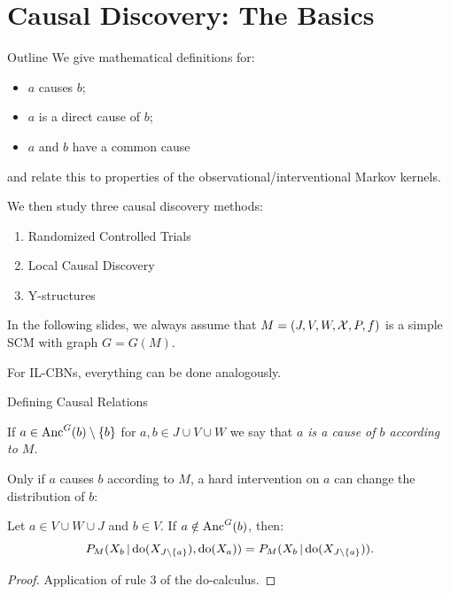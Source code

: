 \part{Causal Discovery: The Basics}
\frame{\partpage}

\begin{frame}{Outline}
  We give mathematical definitions for:
  \begin{itemize}
    \item $a$ causes $b$;
    \item $a$ is a direct cause of $b$;
    \item $a$ and $b$ have a common cause
  \end{itemize}
  and relate this to properties of the observational/interventional Markov kernels.

  \medskip
  We then study three causal discovery methods:
  \begin{enumerate}
    \item Randomized Controlled Trials
    \item Local Causal Discovery
    \item Y-structures
  \end{enumerate}

  \bigskip
  In the following slides, we always assume that
  $M = \left ( J, V, W, \mathcal{X}, P, f \right )$ is a simple SCM with graph $G = G(M)$.

  \bigskip
  For IL-CBNs, everything can be done analogously.
\end{frame}

\begin{frame}{Defining Causal Relations}\label{frame:causes}
\begin{Def}
  If $a \in \mathrm{Anc}^G(b)\setminus \{b\}$ for $a, b \in J \cup V \cup W$ we say that \emph{$a$ is a cause of $b$ according to $M$}.
\end{Def}
Only if $a$ causes $b$ according to $M$, a hard intervention on $a$ can change the distribution of $b$: 
\begin{Prp}
  Let $a \in V \cup W \cup J$ and $b \in V$.
  If $a \notin \mathrm{Anc}^G(b)$, then:
  $$P_{M}(X_b \operatorname*{|} \operatorname{do}(X_{J\setminus \{a\}}),\operatorname{do}(X_a)) = P_{M}(X_b \operatorname*{|} \operatorname{do}(X_{J\setminus \{a\}})).$$
\end{Prp}
\begin{proof}
  Application of rule 3 of the do-calculus.
\end{proof}
\end{frame}

